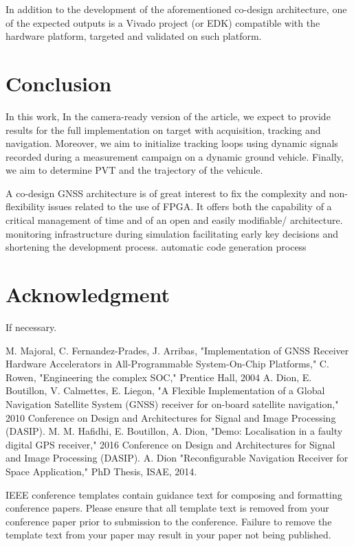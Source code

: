 \documentclass[conference]{IEEEtran}
\begin{document}
In addition to the development of the aforementioned co-design architecture, one of the expected outputs is a Vivado project (or EDK) compatible with the hardware platform, targeted and validated on such platform.

\section{Conclusion}
In this work, 
In the camera-ready version of the article, we expect to provide results for the full implementation on target with acquisition, tracking and navigation. Moreover, we aim to initialize tracking loops using dynamic signals recorded during a measurement campaign on a dynamic ground vehicle. Finally, we aim to determine PVT and the trajectory of the vehicule.


A co-design GNSS architecture is of great interest to fix the complexity and non-flexibility issues related to the use of FPGA. It offers both the capability of a critical management of time and of an open and easily modifiable/ architecture.
monitoring infrastructure during simulation
facilitating early key decisions and shortening the development process.
automatic code generation process




\section*{Acknowledgment}

If necessary.



\begin{thebibliography}{00}
 M. Majoral, C. Fernandez-Prades, J. Arribas, "Implementation of GNSS Receiver Hardware Accelerators in All-Programmable System-On-Chip Platforms," 
 C. Rowen, "Engineering the complex SOC,"  Prentice Hall, 2004
 A. Dion, E. Boutillon, V. Calmettes, E. Liegon, "A Flexible Implementation of a Global Navigation Satellite System (GNSS) receiver for on-board satellite navigation," 2010 Conference on Design and Architectures for Signal and Image Processing (DASIP).
 M. M. Hafidhi, E. Boutillon, A. Dion, "Demo: Localisation in a faulty digital GPS receiver," 2016 Conference on Design and Architectures for Signal and Image Processing (DASIP).
 A. Dion "Reconfigurable Navigation Receiver for Space Application," PhD Thesis, ISAE, 2014.
\end{thebibliography}
\vspace{12pt}
\color{red}
IEEE conference templates contain guidance text for composing and formatting conference papers. Please ensure that all template text is removed from your conference paper prior to submission to the conference. Failure to remove the template text from your paper may result in your paper not being published.
\end{document}
